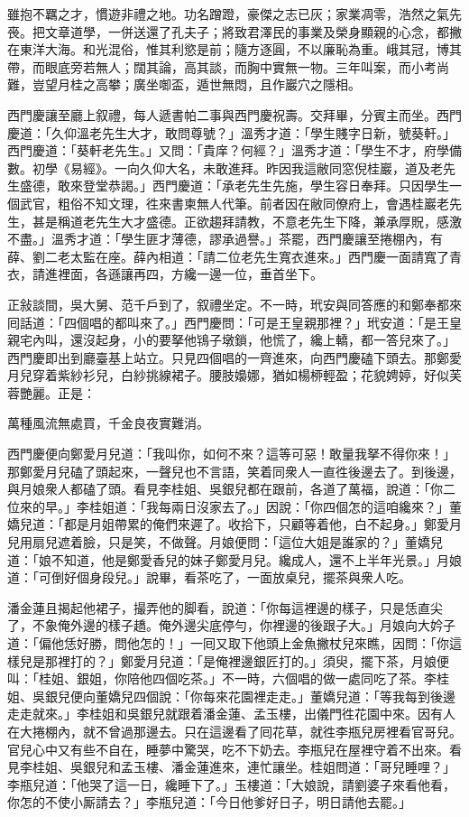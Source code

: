 雖抱不羈之才，慣遊非禮之地。功名蹭蹬，豪傑之志已灰；家業凋零，浩然之氣先䘮。把文章道學，一併送還了孔夫子；將致君澤民的事業及榮身顯親的心念，都撇在東洋大海。和光混俗，惟其利慾是前；隨方逐圓，不以廉恥為重。峨其冠，博其帶，而眼底旁若無人；闊其論，高其談，而胸中實無一物。三年叫案，而小考尚難，豈望月桂之高攀；廣坐啣盃，遁世無悶，且作巖穴之隱相。

西門慶讓至廳上叙禮，每人遞書帕二事與西門慶祝壽。交拜畢，分賓主而坐。西門慶道：「久仰溫老先生大才，敢問尊號？」溫秀才道：「學生賤字日新，號葵軒。」西門慶道：「葵軒老先生。」又問：「貴庠？何經？」溫秀才道：「學生不才，府學備數。初學《易經》。{}一向久仰大名，未敢進拜。昨因我這敝同窓倪桂巖，道及老先生盛德，敢來登堂恭謁。」西門慶道：「承老先生先施，學生容日奉拜。只因學生一個武官，粗俗不知文理，徃來書柬無人代筆。前者因在敝同僚府上，會遇桂巖老先生，甚是稱道老先生大才盛德。正欲趨拜請教，不意老先生下降，兼承厚貺，感激不盡。」溫秀才道：「學生匪才薄德，謬承過譽。」茶罷，西門慶讓至捲棚內，有薛、劉二老太監在座。薛內相道：「請二位老先生寬衣進來。」西門慶一面請寬了青衣，請進裡面，各遜讓再四，方纔一邊一位，垂首坐下。

正敍談間，吳大舅、范千戶到了，叙禮坐定。不一時，玳安與同答應的和鄭奉都來囘話道：「四個唱的都叫來了。」西門慶問：「可是王皇親那裡？」玳安道：「是王皇親宅內叫，還沒起身，小的要拏他鴇子墩鎖，他慌了，纔上轎，都一答兒來了。」西門慶即出到廳臺基上站立。只見四個唱的一齊進來，向西門慶磕下頭去。那鄭愛月兒穿着紫紗衫兒，白紗挑線裙子。腰肢嬝娜，猶如楊桺輕盈；花貌娉婷，好似芙蓉艷麗。正是：

萬種風流無處買，千金良夜實難消。

西門慶便向鄭愛月兒道：「我叫你，如何不來？這等可惡！敢量我拏不得你來！」那鄭愛月兒磕了頭起來，一聲兒也不言語，笑着同衆人一直徃後邊去了。{}到後邊，與月娘衆人都磕了頭。看見李桂姐、吳銀兒都在跟前，各道了萬福，說道：「你二位來的早。」李桂姐道：「我每兩日沒家去了。」因說：「你四個怎的這咱纔來？」董嬌兒道：「都是月姐帶累的俺們來遲了。收拾下，只顧等着他，白不起身。」鄭愛月兒用扇兒遮着臉，只是笑，不做聲。月娘便問：「這位大姐是誰家的？」董嬌兒道：「娘不知道，他是鄭愛香兒的妹子鄭愛月兒。纔成人，還不上半年光景。」月娘道：「可倒好個身段兒。」說畢，看茶吃了，一面放桌兒，擺茶與衆人吃。

潘金蓮且揭起他裙子，撮弄他的脚看，說道：「你每這裡邊的樣子，只是恁直尖了，不象俺外邊的樣子趫。俺外邊尖底停勻，你裡邊的後跟子大。」{}月娘向大妗子道：「偏他恁好勝，問他怎的！」一囘又取下他頭上金魚撇杖兒來瞧，因問：「你這樣兒是那裡打的？」鄭愛月兒道：「是俺裡邊銀匠打的。」須臾，擺下茶，月娘便叫：「桂姐、銀姐，你陪他四個吃茶。」不一時，六個唱的做一處同吃了茶。李桂姐、吳銀兒便向董嬌兒四個說：「你每來花園裡走走。」董嬌兒道：「等我每到後邊走走就來。」{}李桂姐和吳銀兒就跟着潘金蓮、孟玉樓，出儀門徃花園中來。因有人在大捲棚內，就不曾過那邊去。只在這邊看了囘花草，就徃李瓶兒房裡看官哥兒。官兒心中又有些不自在，睡夢中驚哭，吃不下奶去。李瓶兒在屋裡守着不出來。看見李桂姐、吳銀兒和孟玉樓、潘金蓮進來，連忙讓坐。桂姐問道：「哥兒睡哩？」李瓶兒道：「他哭了這一日，纔睡下了。」玉樓道：「大娘說，請劉婆子來看他看，你怎的不使小厮請去？」李瓶兒道：「今日他爹好日子，明日請他去罷。」

